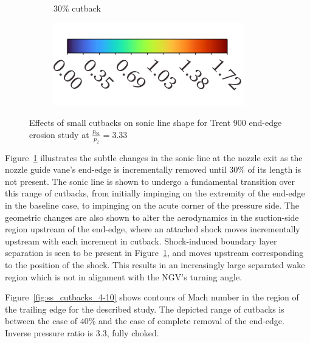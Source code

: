 \documentclass[a4paper, 11pt, oneside]{report}
\begin{document}
\begin{figure}[H]
\begin{subfigure}{.42\textwidth}
		\caption{$30\%$ cutback}
	\end{subfigure}
	\begin{subfigure}{.4\textwidth}
		\centering
		\includegraphics[width=\linewidth]{figs/mach_legend_choked_horizontal.png}
	\end{subfigure}
	\caption{Effects of small cutbacks on sonic line shape for Trent 900 end-edge erosion study at $\frac{p_{01}}{p_2}=3.33$}
	\label{fig:ss_cutbacks_0-3}
\end{figure}

Figure~\ref{fig:ss_cutbacks_0-3} illustrates the subtle changes in the sonic line at the nozzle exit as the nozzle guide vane's end-edge is incrementally removed until $30\%$ of its length is not present. The sonic line is shown to undergo a fundamental transition over this range of cutbacks, from initially impinging on the extremity of the end-edge in the baseline case, to impinging on the acute corner of the pressure side. The geometric changes are also shown to alter the aerodynamics in the suction-side region upstream of the end-edge, where an attached shock moves incrementally upstream with each increment in cutback. Shock-induced boundary layer separation is seen to be present in Figure~\ref{fig:ss_cutbacks_0-3}, and moves upstream corresponding to the position of the shock. This results in an increasingly large separated wake region which is not in alignment with the NGV's turning angle.

Figure~\ref{fig:ss_cutbacks_4-10} shows contours of Mach number in the region of the trailing edge for the described study. The depicted range of cutbacks is between the case of $40\%$ and the case of complete removal of the end-edge. Inverse pressure ratio is $3.3$, fully choked.
\end{document}
